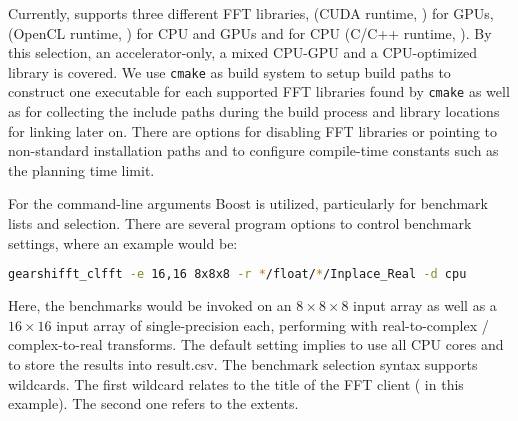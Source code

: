 Currently, \gearshifft{} supports three different FFT libraries, \cufft{} (CUDA runtime, \cite{nvidia2010cufft}) for \nvidia{} GPUs, \clfft{} (OpenCL runtime, \cite{clfft}) for CPU and GPUs and \fftw{} for CPU (C/C++ runtime, \cite{FFTW05}). By this selection, an accelerator-only, a mixed CPU-GPU and a CPU-optimized library is covered.
%
We use \texttt{cmake} as build system to setup build paths to construct one executable for each supported FFT libraries found by \texttt{cmake} as well as for collecting the include paths during the build process and library locations for linking later on. There are options for disabling FFT libraries or pointing to non-standard installation paths and to configure compile-time constants such as the \fftw{} planning time limit. 

For the command-line arguments Boost is utilized, particularly for benchmark lists and selection.
There are several \gearshifft{} program options to control benchmark settings, where an example would be:
\begin{lstlisting}[language=bash]
gearshifft_clfft -e 16,16 8x8x8 -r */float/*/Inplace_Real -d cpu
\end{lstlisting}
Here, the \clfft{} benchmarks would be invoked on an $8\times8\times8$ input array as well as a $16\times16$ input array of single-precision each, performing with real-to-complex / complex-to-real transforms.
The default setting implies to use all CPU cores and to store the results into result.csv. The \gearshifft{} benchmark selection syntax supports wildcards. The first wildcard \mc{*} relates to the title of the FFT client ( in this example). The second one refers to the extents.
